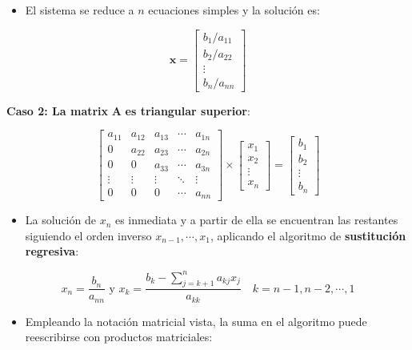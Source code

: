 \documentclass[openany]{book}
\providecommand{\tightlist}{%
  \setlength{\itemsep}{0pt}\setlength{\parskip}{0pt}}
\begin{document}
\begin{itemize}
\tightlist
\item
  El sistema se reduce a \(n\) ecuaciones simples y la solución es:
\end{itemize}

\[
\mathbf{x} =
\begin{bmatrix}
    b_1/a_{11} \\ b_2/a_{22} \\ \vdots \\ b_n/a_{nn}
\end{bmatrix}
\]

\textbf{Caso 2: La matrix} \(\mathbf{A}\) \textbf{es triangular superior}:

\[
\begin{bmatrix}
a_{11} & a_{12} & a_{13} & \cdots & a_{1n} \\
0 & a_{22} & a_{23} & \cdots & a_{2n} \\
0 & 0 & a_{33} & \cdots & a_{3n} \\
\vdots & \vdots & \vdots & \ddots & \vdots \\
0 & 0 & 0 & \cdots & a_{nn}
\end{bmatrix}
\times 
\begin{bmatrix}
x_1 \\ x_2 \\ \vdots \\ x_n
\end{bmatrix}
=
\begin{bmatrix}
b_1 \\ b_2 \\ \vdots \\ b_n
\end{bmatrix}
\]

\begin{itemize}
\tightlist
\item
  La solución de \(x_n\) es inmediata y a partir de ella se encuentran las restantes siguiendo el orden inverso \(x_{n-1}, \cdots, x_1\), aplicando el algoritmo de \textbf{sustitución regresiva}:
\end{itemize}

\[
x_n = \frac{b_n}{a_{nn}} \text{ y } x_k = \frac{b_k - \sum_{j = k+1}^{n}a_{kj}x_j}{a_{kk}} \quad k = n-1, n-2, \cdots, 1
\]

\begin{itemize}
\tightlist
\item
  Empleando la notación matricial vista, la suma en el algoritmo puede reescribirse con productos matriciales:
\end{itemize}
\end{document}

